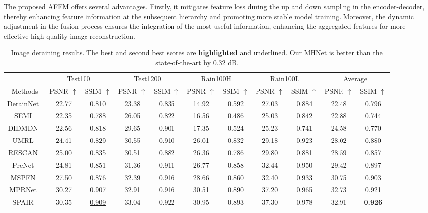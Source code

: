 \documentclass[lettersize,journal]{IEEEtran}
\begin{document}
The proposed AFFM offers several advantages. Firstly, it mitigates feature loss during the up and down sampling  in the encoder-decoder, thereby enhancing feature information at the subsequent hierarchy and promoting more stable model training. Moreover, the dynamic adjustment in the fusion process ensures the integration of the most useful information, enhancing the aggregated features for more effective high-quality image reconstruction.

 
\begin{table*}
\centering
\caption{Image deraining results. The best and second best scores are \textbf{highlighted} and \underline{underlined}. Our MHNet is better than the state-of-the-art by 0.32 dB. }\label{tb:derain}
\begin{tabular}{ccccccccc||cc}
    \hline
    \multicolumn{1}{c}{} & \multicolumn{2}{c}{Test100~\cite{Test100}}  & \multicolumn{2}{c}{Test1200~\cite{MSPFN}} & \multicolumn{2}{c}{Rain100H~\cite{Rain100}} & \multicolumn{2}{c||}{Rain100L~\cite{Rain100}} & \multicolumn{2}{c}{Average} 
    \\
   Methods &PSNR $\uparrow$ &  SSIM $\uparrow$  & PSNR $\uparrow$ & SSIM $\uparrow$ &PSNR $\uparrow$ &SSIM $\uparrow$ & PSNR $\uparrow$&SSIM $\uparrow$ &PSNR $\uparrow$ & SSIM $\uparrow$
    \\
    \hline\hline
    DerainNet~\cite{DerainNet}  & 22.77 & 0.810  & 23.38  & 0.835  & 14.92 &  0.592  & 27.03 & 0.884 & 22.48 & 0.796 
    \\
     SEMI~\cite{semi}  & 22.35  & 0.788  & 26.05 & 0.822  & 16.56 &  0.486 & 25.03 & 0.842 & 22.88  & 0.744 
     \\
    DIDMDN~\cite{DIDMDN} & 22.56 & 0.818  & 29.65 & 0.901  & 17.35 &  0.524 &25.23 & 0.741 & 24.58  & 0.770
     \\
    UMRL~\cite{UMRL}  & 24.41 &0.829 & 30.55 &  0.910   & 26.01 & 0.832 & 29.18 & 0.923& 28.02  & 0.880 
       \\
    RESCAN~\cite{RESCAN}  & 25.00 & 0.835 & 30.51 & 0.882  &26.36 & 0.786 & 29.80 &0.881 & 28.59  & 0.857
       \\
     PreNet~\cite{PREnet}  & 24.81 &0.851 & 31.36&  0.911   & 26.77 & 0.858  &32.44 & 0.950 &29.42  & 0.897 
    \\
   MSPFN~\cite{MSPFN}  & 27.50 & 0.876 & 32.39 &  0.916   & 28.66 & 0.860  & 32.40 & 0.933 & 30.75  & 0.903
       \\
     MPRNet~\cite{Zamir2021MPRNet}  & 30.27 & 0.907 & 32.91 &  0.916   & 30.51 & 0.890  & 37.20 & 0.965 & 32.73 & 0.921
       \\
     SPAIR~\cite{SPAIR}  & 30.35 & \underline{0.909} & 33.04 &  0.922   & 30.95 & 0.893  & 37.30 & 0.978& 32.91 & \textbf{0.926}
     \\
    

\end{tabular}
\end{table*}
\end{document}
